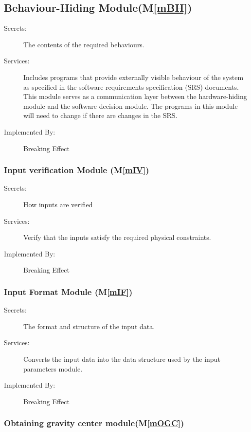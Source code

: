 \documentclass[12pt, titlepage]{article}
\newcommand{\mref}[1]{M\ref{#1}}
\begin{document}
	\subsection{Behaviour-Hiding Module(\mref{mBH})}
	
	\begin{description}
		\item[Secrets:]The contents of the required behaviours.
		\item[Services:]Includes programs that provide externally visible behaviour of
		the system as specified in the software requirements specification (SRS)
		documents. This module serves as a communication layer between the
		hardware-hiding module and the software decision module. The programs in this
		module will need to change if there are changes in the SRS.
		\item[Implemented By:] Breaking Effect
	\end{description}
	
	\subsubsection{Input verification Module (\mref{mIV})}
	
	\begin{description}
		\item[Secrets:]How inputs are verified
		\item[Services:]Verify that the inputs satisfy the required physical constraints.
		\item[Implemented By:] Breaking Effect
	\end{description}
	
	\subsubsection{Input Format Module (\mref{mIF})}
	
	\begin{description}
		\item[Secrets:]The format and structure of the input data.
		\item[Services:]Converts the input data into the data structure used by the
		input parameters module. 
		\item[Implemented By:] Breaking Effect
	\end{description}
	
	\subsubsection{Obtaining gravity center module(\mref{mOGC})}
	
\end{document}
